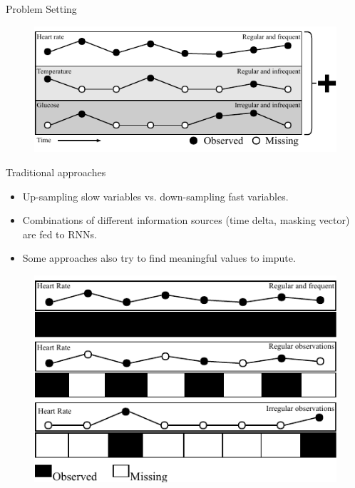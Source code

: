 \documentclass[final, 18pt]{beamer}
\newlength{\onecolwid}
\begin{document}
\begin{frame}
\begin{columns}[t]
\begin{column}{\onecolwid}
\begin{alertblock}{\centering Problem Setting}
\begin{figure}
    \centering
    \includegraphics[width=.9\onecolwid]{./img/problem_definition.pdf}
\end{figure}
\end{alertblock}


\begin{alertblock}{\centering Traditional approaches}
\begin{itemize}
    \item Up-sampling slow variables vs. down-sampling fast variables.
    \item Combinations of different information sources (time delta, masking vector) are fed to RNNs.
    \item Some approaches also try to find meaningful values to impute.
\end{itemize}

\begin{figure}
    \centering
    \includegraphics[width=.8\onecolwid]{./img/additional_information.pdf}
\end{figure}
\end{alertblock}


\end{column}
\end{columns}
\end{frame}
\end{document}
